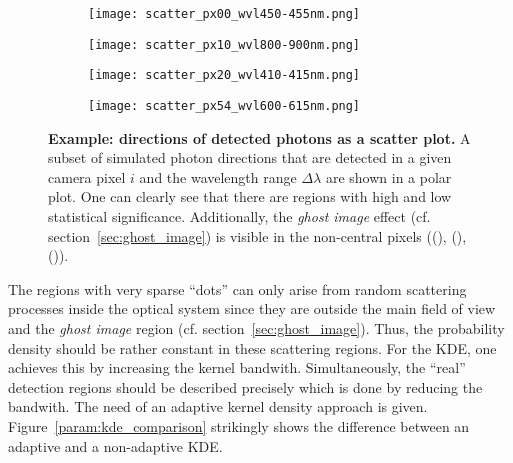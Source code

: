\begin{figure}[H]
	\centering
	\begin{subfigure}[t]{0.49\textwidth}
		\texttt{[image: scatter\_px00\_wvl450-455nm.png]}
		\subcaption{}
		\label{param:example_scatter:1}
	\end{subfigure}
	\hfill
	\begin{subfigure}[t]{0.49\textwidth}
		\texttt{[image: scatter\_px10\_wvl800-900nm.png]}
		\subcaption{}
		\label{param:example_scatter:2}
	\end{subfigure}
	\vfill
	\begin{subfigure}[b]{0.49\textwidth}
		\texttt{[image: scatter\_px20\_wvl410-415nm.png]}
		\subcaption{}
		\label{param:example_scatter:3}
	\end{subfigure}
	\hfill
	\begin{subfigure}[b]{0.49\textwidth}
		\texttt{[image: scatter\_px54\_wvl600-615nm.png]}
		\subcaption{}
		\label{param:example_scatter:4}
	\end{subfigure}
	\caption[Example: directions of detected photons as a scatter plot]{\textbf{Example: directions of detected photons as a scatter plot.} A subset of simulated photon directions that are detected in a given camera pixel $i$ and the wavelength range $\Delta\lambda$ are shown in a polar plot. One can clearly see that there are regions with high and low statistical significance. Additionally, the \textit{ghost image} effect (cf. section~\ref{sec:ghost_image}) is visible in the non-central pixels ((), (), ()).}
	\label{param:example_scatter}	
\end{figure}
\newpage
The regions with very sparse \enquote{dots} can only arise from random scattering processes inside the optical system since they are outside the main field of view and the \textit{ghost image} region (cf. section~\ref{sec:ghost_image}). Thus, the probability density should be rather constant in these scattering regions. For the KDE, one achieves this by increasing the kernel bandwith. Simultaneously, the \enquote{real} detection regions should be described precisely which is done by reducing the bandwith. The need of an adaptive kernel density approach is given. Figure~\ref{param:kde_comparison} strikingly shows the difference between an adaptive and a non-adaptive KDE.\\


